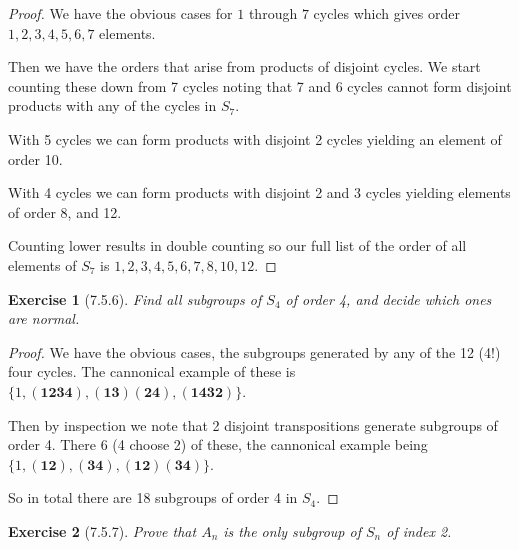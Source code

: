 \documentclass[12pt]{article}
\newtheorem*{exer}{Exercise}
\newcommand{\cycle}[1]{(\mathbf{#1})}
\begin{document}
\begin{proof}

    We have the obvious cases for $1$ through $7$ cycles which gives
    order $1, 2, 3, 4, 5, 6, 7$ elements. 

    Then we have the orders that arise from products of disjoint cycles.
    We start counting these down from 7 cycles noting that 7 and 6
    cycles cannot form disjoint products with any of the cycles in
    $S_7$. 
    
    With 5 cycles we can form products with disjoint 2
    cycles yielding an element of order 10.

    With 4 cycles we can form products with disjoint 2 and 3 cycles
    yielding elements of order 8, and 12.

    Counting lower results in double counting so our full list of the
    order of all elements of $S_7$ is $1, 2, 3, 4, 5, 6, 7, 8, 10, 12$.

\end{proof}


\begin{exer}[7.5.6]

    Find all subgroups of $S_4$ of order 4, and decide which ones are
    normal.

\end{exer}

\begin{proof}

    We have the obvious cases, the subgroups generated by any of the 12
    (4!) four cycles. The cannonical example of these is $\{1,
        \cycle{1234}, \cycle{13}\cycle{24}, \cycle{1432} \}$.

    Then by inspection we note that 2 disjoint transpositions generate
    subgroups of order 4. There 6 (4 choose 2) of these, the cannonical
    example being $\{1, \cycle{12}, \cycle{34}, \cycle{12}\cycle{34}\}$. 

    So in total there are 18 subgroups of order 4 in $S_4$.

\end{proof}


\begin{exer}[7.5.7]

    Prove that $A_n$ is the only subgroup of $S_n$ of index 2.

\end{exer}
\end{document}
